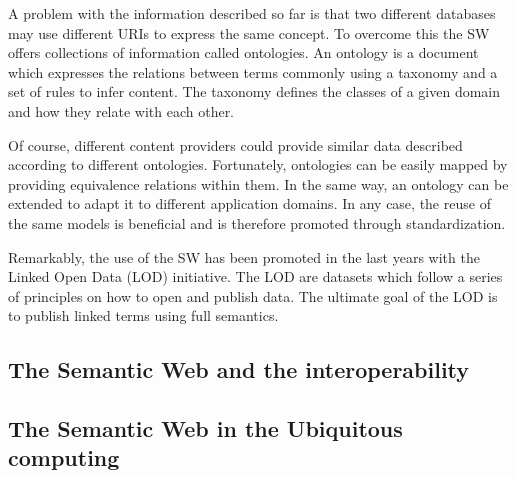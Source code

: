 

A problem with the information described so far is that two different databases may use different URIs to express the same concept.
To overcome this the SW offers collections of information called ontologies.
An ontology is a document which expresses the relations between terms commonly using a taxonomy and a set of rules to infer content.
The taxonomy defines the classes of a given domain and how they relate with each other.

Of course, different content providers could provide similar data described according to different ontologies.
Fortunately, ontologies can be easily mapped by providing equivalence relations within them.
In the same way, an ontology can be extended to adapt it to different application domains.
In any case, the reuse of the same models is beneficial and is therefore promoted through standardization.

Remarkably, the use of the SW has been promoted in the last years with the Linked Open Data (LOD) initiative.
The LOD are datasets which follow a series of principles on how to open and publish data.
The ultimate goal of the LOD is to publish linked terms using full semantics.


\subsection{The Semantic Web and the interoperability}



\subsection{The Semantic Web in the Ubiquitous computing}



